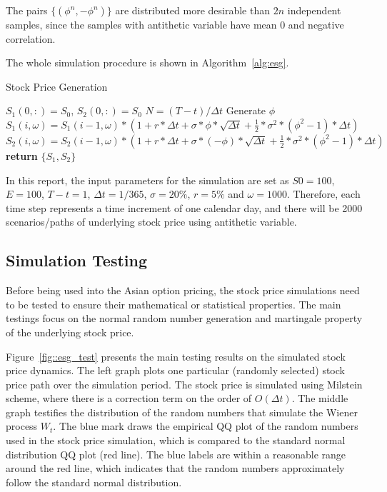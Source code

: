 \documentclass[a4paper,11pt] {article}
\begin{document}
The pairs $\{(\phi^{n},-\phi^{n})\}$ are distributed more desirable than $2n$ independent samples, since the samples with antithetic variable have mean 0 and negative correlation.

The whole simulation procedure is shown in Algorithm~\ref{alg:esg}.

\begin{algorithm}
\caption{Stock Price Generation}\label{alg:esg}
\begin{algorithmic}[1]
\State $S_1(0,:) = S_0$, $S_2(0,:) = S_0$
\State $N = (T-t)/\Delta t$ 
    
\State Generate $\phi$
\State $S_1(i,\omega)= S_1(i-1,\omega) * (1 + r * \Delta t + \sigma * \phi * \sqrt{\Delta t} + \frac{1}{2} * \sigma^2 *(\phi^2-1)*\Delta t)$
\State $S_2(i,\omega)= S_2(i-1,\omega) * (1 + r * \Delta t + \sigma * (-\phi) * \sqrt{\Delta t} + \frac{1}{2} * \sigma^2 *(\phi^2-1)*\Delta t)$
\EndFor
\EndFor %
\State \textbf{return} $\{S_1, S_2\}$  %
\EndProcedure
\end{algorithmic}
\end{algorithm}

In this report, the input parameters for the simulation are set as $S0 = 100$, $E = 100$, $T-t=1$, $\Delta t = 1/365$, $\sigma = 20\%$, $r = 5\%$ and $\omega = 1000$. Therefore, each time step represents a time increment of one calendar day, and there will be 2000 scenarios/paths of underlying stock price using antithetic variable.

\subsection{Simulation Testing}
Before being used into the Asian option pricing, the stock price simulations need to be tested to ensure their mathematical or statistical properties. The main testings focus on the normal random number generation and martingale property of the underlying stock price.

Figure~\ref{fig::esg_test} presents the main testing results on the simulated stock price dynamics. The left graph plots one particular (randomly selected) stock price path over the simulation period. The stock price is simulated using Milstein scheme, where there is a correction term on the order of $O(\Delta t)$. The middle graph testifies the distribution of the random numbers that simulate the Wiener process $W_t$. The blue mark draws the empirical QQ plot of the random numbers used in the stock price simulation, which is compared to the standard normal distribution QQ plot (red line). The blue labels are within a reasonable range around the red line, which indicates that the random numbers approximately follow the standard normal distribution.
\end{document}

